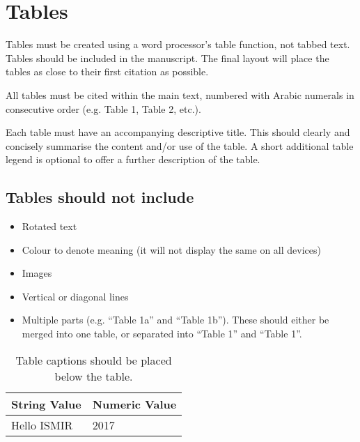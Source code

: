 \section{Tables}\label{sec:tables}

Tables must be created using a word processor's table function, 
not tabbed text. 
Tables should be included in the manuscript.
The final layout will place the tables as close to their first
citation as possible.

All tables must be cited within the main text, numbered with Arabic 
numerals in consecutive order (e.g. Table 1, Table 2, etc.).

Each table must have an accompanying descriptive title.
This should clearly and concisely summarise the content and/or 
use of the table. 
A short additional table legend is optional to offer a further
description of the table.

\subsection{Tables should not include}

\begin{itemize}
\item Rotated text
\item Colour to denote meaning (it will not display the same on all devices)
\item Images
\item Vertical or diagonal lines
\item Multiple parts (e.g. ``Table 1a'' and ``Table 1b'').
These should either be merged into one table,
or separated into ``Table 1'' and ``Table 1''.
\end{itemize}

\begin{table}[htpb]
\centering

\begin{tabular}{|l|l|}
\hline
String Value & Numeric Value \\ \hline
Hello ISMIR  & 2017          \\ \hline
\end{tabular}
\caption{Table captions should be placed below the table.}
\label{tab:table}
\end{table}
